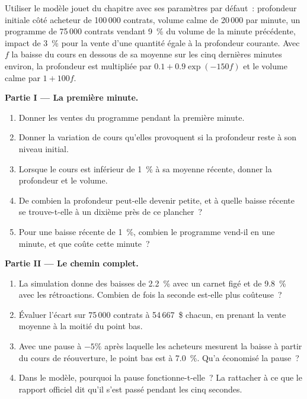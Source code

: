 \begin{problem}\label{pb:m1:stress-case-studies:1}
Utiliser le modèle jouet du chapitre avec ses paramètres par défaut~: profondeur
initiale côté acheteur de 100\,000 contrats, volume calme de 20\,000 par minute,
un programme de 75\,000 contrats vendant 9~\% du volume de la minute précédente,
impact de 3~\% pour la vente d'une quantité égale à la profondeur courante. Avec
$f$ la baisse du cours en dessous de sa moyenne sur les cinq dernières minutes
environ, la profondeur est multipliée par $0.1 + 0.9\exp(-150 f)$ et le volume calme par $1 + 100 f$.

\medskip\noindent\textbf{Partie I --- La première minute.}
\begin{enumerate}
\item Donner les ventes du programme pendant la première minute.
\item Donner la variation de cours qu'elles provoquent si la profondeur reste à son niveau initial.
\item Lorsque le cours est inférieur de 1~\% à sa moyenne récente, donner la profondeur et le
volume.
\item De combien la profondeur peut-elle devenir petite, et à quelle baisse récente se trouve-t-elle
à un dixième près de ce plancher~?
\item Pour une baisse récente de 1~\%, combien le programme vend-il en une minute,
et que coûte cette minute~?
\end{enumerate}

\medskip\noindent\textbf{Partie II --- Le chemin complet.}
\begin{enumerate}[resume]
\item La simulation donne des baisses de 2.2~\% avec un carnet figé et de 9.8~\% avec les
rétroactions. Combien de fois la seconde est-elle plus coûteuse~?
\item Évaluer l'écart sur 75\,000 contrats à 54\,667~\$ chacun, en prenant
la vente moyenne à la moitié du point bas.
\item Avec une pause à $-5\%$ après laquelle les acheteurs mesurent la baisse à partir du
cours de réouverture, le point bas est à 7.0~\%. Qu'a économisé la pause~?
\item Dans le modèle, pourquoi la pause fonctionne-t-elle~? La rattacher à ce que le rapport officiel
dit qu'il s'est passé pendant les cinq secondes.
\end{enumerate}


\end{problem}
